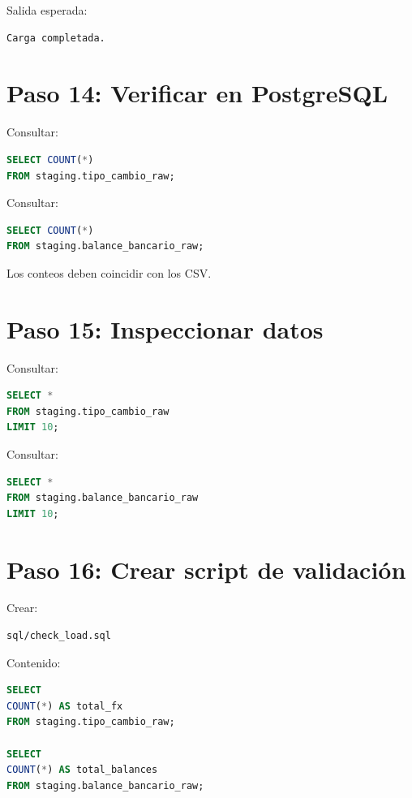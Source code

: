 Salida esperada:

\begin{verbatim}
Carga completada.
\end{verbatim}

\section{Paso 14: Verificar en PostgreSQL}

Consultar:

\begin{lstlisting}[language=SQL]
SELECT COUNT(*)
FROM staging.tipo_cambio_raw;
\end{lstlisting}

Consultar:

\begin{lstlisting}[language=SQL]
SELECT COUNT(*)
FROM staging.balance_bancario_raw;
\end{lstlisting}

Los conteos deben coincidir con los CSV.

\section{Paso 15: Inspeccionar datos}

Consultar:

\begin{lstlisting}[language=SQL]
SELECT *
FROM staging.tipo_cambio_raw
LIMIT 10;
\end{lstlisting}

Consultar:

\begin{lstlisting}[language=SQL]
SELECT *
FROM staging.balance_bancario_raw
LIMIT 10;
\end{lstlisting}

\section{Paso 16: Crear script de validación}

Crear:

\begin{verbatim}
sql/check_load.sql
\end{verbatim}

Contenido:

\begin{lstlisting}[language=SQL]
SELECT
COUNT(*) AS total_fx
FROM staging.tipo_cambio_raw;

SELECT
COUNT(*) AS total_balances
FROM staging.balance_bancario_raw;
\end{lstlisting}


